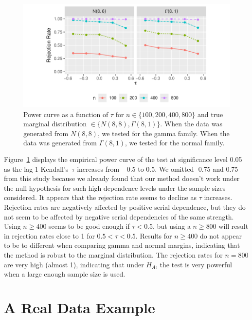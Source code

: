 \documentclass[APA,Times1COL]{WileyNJDv5} %
\begin{document}
\begin{figure}[tbp]
  \centering
  \includegraphics[scale=1]{figures/rr}
  \caption{Power curve as a function of $\tau$ for
    $n \in \{100, 200, 400, 800\}$ and true marginal distribution 
    $\in \{N(8,8), \Gamma(8,1)\}$. When the data was generated from $N(8,8)$,
    we tested for the gamma family. When the data was generated from 
    $\Gamma(8,1)$, we tested for the normal family. 
  }
  \label{fig:rr}
\end{figure}


Figure~\ref{fig:rr} displays the empirical power curve of the test at
significance level 0.05 as the lag-1 Kendall's~$\tau$ increases from
$-0.5$ to $0.5$. We omitted -0.75 and 0.75 from this study because we already 
found that our method doesn't work under the null hypothesis for such high
dependence levels under the sample sizes considered. It appears that the 
rejection rate seems to decline as $\tau$
increases. Rejection rates are negatively affected by positive serial 
dependence, but they do not seem to be affected by negative serial dependencies
of the same strength.
Using $n \geq 400$ seems to be good enough
if $\tau < 0.5$, but using a $n \geq 800$ will result in 
rejection rates close to 1 for $0.5 < \tau < 0.5$.
Results for $n \geq 400$
do not appear to be to different when comparing gamma and normal 
margins, indicating that the method is robust to the marginal distribution.
The rejection rates for $n = 800$ are very 
high (almost 1), indicating that under $H_A$, the test is very powerful 
when a large enough sample size is used.


\section{A Real Data Example}
\label{sec:real}
\end{document}

